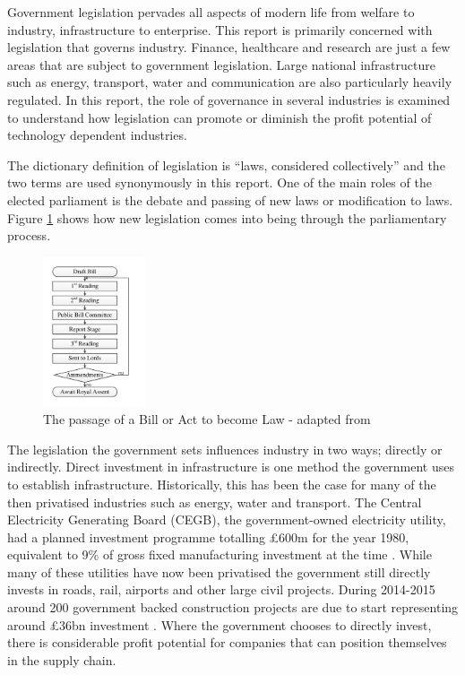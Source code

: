 
{}

Government legislation pervades all aspects of modern life from welfare to industry, infrastructure to enterprise.
This report is primarily concerned with legislation that governs industry.
Finance, healthcare and research are just a few areas that are subject to government legislation.
Large national infrastructure such as energy, transport, water and communication are also particularly heavily regulated.
In this report, the role of governance in several industries is examined to understand how legislation can promote or diminish the profit potential of technology dependent industries.

The dictionary definition of legislation is ``laws, considered collectively'' \cite{OED} and the two terms are used synonymously in this report.
One of the main roles of the elected parliament is the debate and passing of new laws or modification to laws.
Figure \ref{figure:passage} shows how new legislation comes into being through the parliamentary process.

\begin{figure}[!h]
\centering
\includegraphics[width = 0.27\textwidth]{Figures/BillFormulation.pdf}
\caption{The passage of a Bill or Act to become Law - adapted from \cite{Factsheet2010}}
\label{figure:passage}
\end{figure}

The legislation the government sets influences industry in two ways; directly or indirectly.
Direct investment in infrastructure is one method the government uses to establish infrastructure.
Historically, this has been the case for many of the then privatised industries such as energy, water and transport.
The Central Electricity Generating Board (CEGB), the government-owned electricity utility, had a planned investment programme totalling \pounds600m for the year 1980, equivalent to 9\% of gross fixed manufacturing investment at the time \cite{CEGB1980}.
While many of these utilities have now been privatised the government still directly invests in roads, rail, airports and other large civil projects.
During 2014-2015 around 200 government backed construction projects are due to start representing around \pounds36bn investment \cite{GovPress2014}.
Where the government chooses to directly invest, there is considerable profit potential for companies that can position themselves in the supply chain. 

